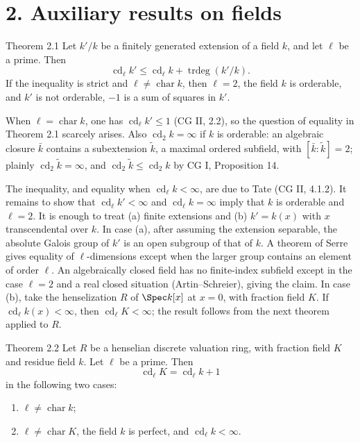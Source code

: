 \section*{2. Auxiliary results on fields}

\begin{statement}{Theorem 2.1}
Let \(k'/k\) be a finitely generated extension of a field \(k\), and let \(\ell\) be a prime. Then
\[
\operatorname{cd}_\ell k'\leq \operatorname{cd}_\ell k+\operatorname{trdeg}(k'/k).
\]
If the inequality is strict and \(\ell\ne\operatorname{char}k\), then \(\ell=2\), the field \(k\) is orderable, and \(k'\) is not orderable, \ie \(-1\) is a sum of squares in \(k'\).
\end{statement}

When \(\ell=\operatorname{char}k\), one has \(\operatorname{cd}_\ell k'\leq1\) (CG II, 2.2), so the question of equality in Theorem 2.1 scarcely arises. Also \(\operatorname{cd}_2k=\infty\) if \(k\) is orderable: an algebraic closure \(\bar k\) contains a subextension \(\widetilde k\), a maximal ordered subfield, with \([\bar k:\widetilde k]=2\); plainly \(\operatorname{cd}_2\widetilde k=\infty\), and \(\operatorname{cd}_2\widetilde k\leq\operatorname{cd}_2k\) by CG I, Proposition 14.

\begin{prooftext}
The inequality, and equality when \(\operatorname{cd}_\ell k<\infty\), are due to Tate (CG II, 4.1.2). It remains to show that \(\operatorname{cd}_\ell k'<\infty\) and \(\operatorname{cd}_\ell k=\infty\) imply that \(k\) is orderable and \(\ell=2\). It is enough to treat (a) finite extensions and (b) \(k'=k(x)\) with \(x\) transcendental over \(k\). In case (a), after assuming the extension separable, the absolute Galois group of \(k'\) is an open subgroup of that of \(k\). A theorem of Serre gives equality of \(\ell\)-dimensions except when the larger group contains an element of order \(\ell\). An algebraically closed field has no finite-index subfield except in the case \(\ell=2\) and a real closed situation (Artin--Schreier), giving the claim. In case (b), take the henselization \(R\) of \(\Spec k[x]\) at \(x=0\), with fraction field \(K\). If \(\operatorname{cd}_\ell k(x)<\infty\), then \(\operatorname{cd}_\ell K<\infty\); the result follows from the next theorem applied to \(R\).
\end{prooftext}

\begin{statement}{Theorem 2.2}
Let \(R\) be a henselian discrete valuation ring, with fraction field \(K\) and residue field \(k\). Let \(\ell\) be a prime. Then
\[
\operatorname{cd}_\ell K=\operatorname{cd}_\ell k+1
\]
in the following two cases:
\begin{enumerate}[label=(\roman*)]
\item \(\ell\ne\operatorname{char}k\);
\item \(\ell\ne\operatorname{char}K\), the field \(k\) is perfect, and \(\operatorname{cd}_\ell k<\infty\).
\end{enumerate}
\end{statement}

